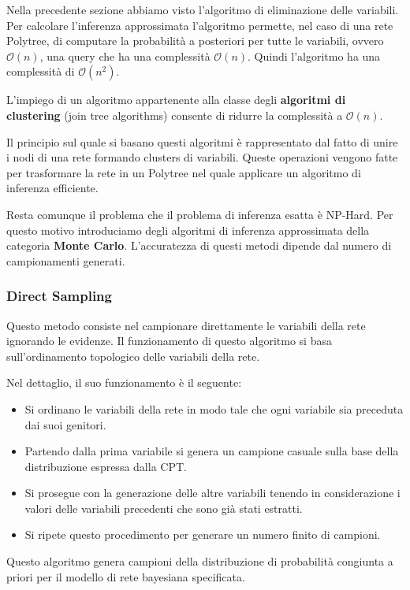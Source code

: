 Nella precedente sezione abbiamo visto l'algoritmo di eliminazione delle
variabili. Per calcolare l'inferenza approssimata l'algoritmo permette, nel caso
di una rete Polytree, di computare la probabilità a posteriori per tutte le
variabili, ovvero $\mathcal{O}(n)$, una query che ha una complessità $\mathcal{O}(n)$.
Quindi l'algoritmo ha una complessità di $\mathcal{O}(n^2)$.

L'impiego di un algoritmo appartenente alla classe degli \textbf{algoritmi di
    clustering} (join tree algorithms) consente di ridurre la complessità a $\mathcal{O}(n)$.

Il principio sul quale si basano questi algoritmi è rappresentato dal fatto di
unire i nodi di una rete formando clusters di variabili. Queste operazioni vengono
fatte per trasformare la rete in un Polytree nel quale applicare un algoritmo di
inferenza efficiente.

Resta comunque il problema che il problema di inferenza esatta è NP-Hard. Per
questo motivo introduciamo degli algoritmi di inferenza approssimata della categoria
\textbf{Monte Carlo}. L'accuratezza di questi metodi dipende dal numero di campionamenti
generati.
\subsubsection{Direct Sampling}
Questo metodo consiste nel campionare direttamente le variabili della rete ignorando
le evidenze. Il funzionamento di questo algoritmo si basa sull'ordinamento
topologico delle variabili della rete.

Nel dettaglio, il suo funzionamento è il seguente:
\begin{itemize}
    \item Si ordinano le variabili della rete in modo tale che ogni variabile
          sia preceduta dai suoi genitori.
    \item Partendo dalla prima variabile si genera un campione casuale sulla base
          della distribuzione espressa dalla CPT.
    \item Si prosegue con la generazione delle altre variabili tenendo in
          considerazione i valori delle variabili precedenti che sono già stati
          estratti.
    \item Si ripete questo procedimento per generare un numero finito di campioni.
\end{itemize}
Questo algoritmo genera campioni della distribuzione di probabilità congiunta a
priori per il modello di rete bayesiana specificata.

